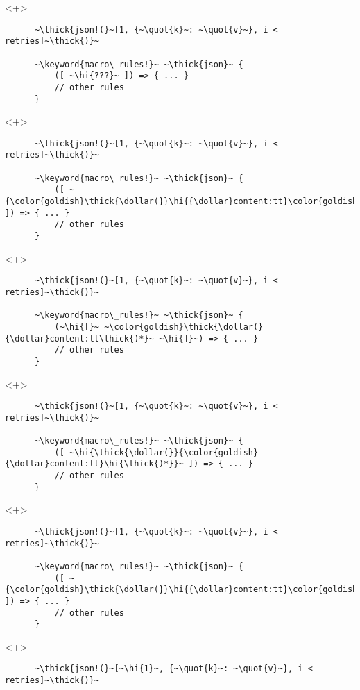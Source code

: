 \documentclass[usepdftitle=false,aspectratio=169]{beamer}
\newcommand{\dollar}{\makebox[\widthof{\$}][c]{\$}}
\newcommand{\thick}[1]{\contourlength{0.16pt}\contour[10]{black}{#1}}
\newcommand{\slantbox}[2][.5]
  {%
    \mbox
      {%
        \sbox{\foobox}{#2}%
        \hskip\wd\foobox
        \pdfsave
        \pdfsetmatrix{1 0 #1 1}%
        \llap{\usebox{\foobox}}%
        \pdfrestore
      }%
  }
\newcommand{\backslantbox}[2][.5]
  {%
    \mbox
      {%
        \sbox{\foobox}{#2}%
        \hskip\wd\foobox
        \pdfsave
        \pdfsetmatrix{-1 0 #1 1}%
        \llap{\usebox{\foobox}}%
        \pdfrestore
      }%
  }
\newcommand{\hi}[1]{%
\tikz[baseline=(A.base)]
 \node[highlighting=yellowbg,inner sep=0pt,text depth=0pt] (A) {#1};%
}
\newcommand{\openquote}{\backslantbox[.2]{\hspace{11pt}''\hspace{-11pt}}}
\newcommand{\closequote}{\slantbox[-.2]{\hspace{2pt}''\hspace{-2pt}}}
\newcommand{\blackquote}[1]{\openquote#1\closequote}
\newcommand{\quot}[1]{{\color{redish}\blackquote{#1}}}
\newcommand{\keyword}[1]{\color{greenish}#1}
\begin{document}
\begin{frame}[fragile]
  \begin{onlyenv}<+>
    \begin{verbatim}
      ~\thick{json!(}~[1, {~\quot{k}~: ~\quot{v}~}, i < retries]~\thick{)}~

      ~\keyword{macro\_rules!}~ ~\thick{json}~ {
          ([ ~\hi{???}~ ]) => { ... }
          // other rules
      }
    \end{verbatim}
  \end{onlyenv}
  \begin{onlyenv}<+>
    \begin{verbatim}
      ~\thick{json!(}~[1, {~\quot{k}~: ~\quot{v}~}, i < retries]~\thick{)}~

      ~\keyword{macro\_rules!}~ ~\thick{json}~ {
          ([ ~{\color{goldish}\thick{\dollar(}}\hi{{\dollar}content:tt}\color{goldish}\thick{)*}~ ]) => { ... }
          // other rules
      }
    \end{verbatim}
  \end{onlyenv}
  \begin{onlyenv}<+>
    \begin{verbatim}
      ~\thick{json!(}~[1, {~\quot{k}~: ~\quot{v}~}, i < retries]~\thick{)}~

      ~\keyword{macro\_rules!}~ ~\thick{json}~ {
          (~\hi{[}~ ~\color{goldish}\thick{\dollar(}{\dollar}content:tt\thick{)*}~ ~\hi{]}~) => { ... }
          // other rules
      }
    \end{verbatim}
  \end{onlyenv}
  \begin{onlyenv}<+>
    \begin{verbatim}
      ~\thick{json!(}~[1, {~\quot{k}~: ~\quot{v}~}, i < retries]~\thick{)}~

      ~\keyword{macro\_rules!}~ ~\thick{json}~ {
          ([ ~\hi{\thick{\dollar(}}{\color{goldish}{\dollar}content:tt}\hi{\thick{)*}}~ ]) => { ... }
          // other rules
      }
    \end{verbatim}
  \end{onlyenv}
  \begin{onlyenv}<+>
    \begin{verbatim}
      ~\thick{json!(}~[1, {~\quot{k}~: ~\quot{v}~}, i < retries]~\thick{)}~

      ~\keyword{macro\_rules!}~ ~\thick{json}~ {
          ([ ~{\color{goldish}\thick{\dollar(}}\hi{{\dollar}content:tt}\color{goldish}\thick{)*}~ ]) => { ... }
          // other rules
      }
    \end{verbatim}
  \end{onlyenv}
  \begin{onlyenv}<+>
    \vspace{-20.5pt}
    \begin{verbatim}
      ~\thick{json!(}~[~\hi{1}~, {~\quot{k}~: ~\quot{v}~}, i < retries]~\thick{)}~


\end{verbatim}
\end{onlyenv}
\end{frame}
\end{document}
